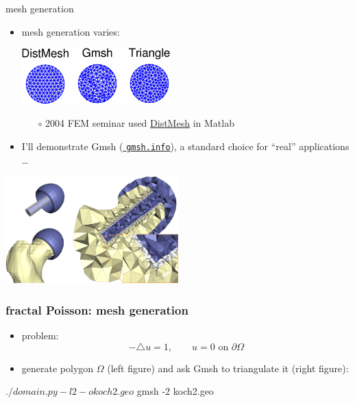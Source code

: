 \documentclass[hide notes,intlimits,usenames,dvipsnames]{beamer}
\begin{document}
\begin{frame}{mesh generation}
\begin{itemize}
\item mesh generation varies:

\medskip
\begin{center}
\includegraphics[width=0.45\textwidth]{meshcomparison}
\end{center}

    \vspace{-1mm}
    \begin{itemize}
    \item[$\circ$] 2004 FEM seminar used \href{https://popersson.github.io/distmesh/}{\color{blue} DistMesh} in Matlab
    \end{itemize}

\item I'll demonstrate Gmsh (\href{http://gmsh.info/}{\color{blue} \texttt{gmsh.info}}), a standard choice for ``real'' applications \dots
\end{itemize}

\begin{center}
\includegraphics[width=0.5\textwidth]{hipjoint}
\end{center}
\end{frame}


\begin{frame}[fragile]
\frametitle{fractal Poisson: mesh generation}
\begin{itemize}
\item problem:
    $$-\triangle u = 1, \qquad u=0 \text{ on } \partial\Omega$$
\item generate polygon $\Omega$ (left figure) and ask Gmsh to triangulate it (right figure):
\end{itemize}

\begin{cline}
$ ./domain.py -l 2 -o koch2.geo
$ gmsh -2 koch2.geo
\end{cline}

\begin{center}
 \qquad 
\end{center}
\end{frame}
\end{document}
